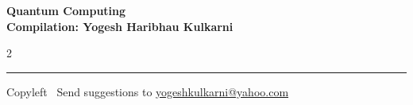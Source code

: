 \documentclass[8pt,landscape]{article}
\begin{document}
\footnotesize


\begin{center}
\Large{\textbf{Quantum Computing\\ Compilation: Yogesh Haribhau Kulkarni}}  
\end{center}

\begin{multicols}{2}

\end{multicols}

\rule{\linewidth}{0.25pt}
\scriptsize
Copyleft \textcopyleft\  Send suggestions to 
\href{http://www.yogeshkulkarni.com}{yogeshkulkarni@yahoo.com}
\end{document}
